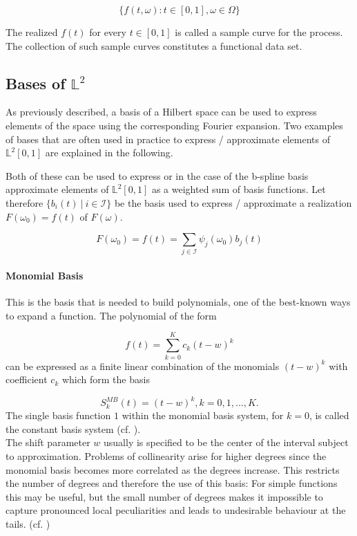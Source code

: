 \documentclass[11pt,twoside,a4paper]{article}
\begin{document}
	\begin{equation}
	\{f(t,\omega) : t \in [0, 1], \omega \in \Omega\}
	\end{equation}
	
	The realized $f(t)$ for every $t \in [0,1]$ is called a sample curve for the process. The collection of such sample curves constitutes a functional data set.
	
	\subsection{Bases of $\mathbb{L}^2$}
	As previously described, a basis of a Hilbert space can be used to express elements of the space using the corresponding Fourier expansion. Two examples of bases that are often used in practice to express / approximate elements of $\mathbb{L}^2[0,1]$  are explained in the following.
	
	Both of these can be used to express or in the case of the b-spline basis approximate elements of $\mathbb{L}^2[0,1]$ as a weighted sum of basis functions. Let therefore $\{b_i(t) \: \vert \: i \in \mathcal{I}\}$ be the basis used to express / approximate a realization $F(\omega_0) = f(t)$ of $F(\omega)$.
	
	\begin{equation}
		F(\omega_0) = f(t) = \sum_{j \in \mathcal{I}} \psi_j(\omega_0) b_j(t)
	\end{equation}
	
	\paragraph{Monomial Basis}
This is the basis that is needed to build polynomials, one of the best-known ways to expand a function.
The polynomial of the form 

	\begin{equation}
		f(t) = \sum_{k =0}^{K} c_k(t -w)^{k}
	\end{equation}
	can be expressed as a finite linear combination of the monomials $(t - w)^{k}$ with coefficient $c_k$ which form the basis 
	
	\begin{equation}
		S_{k}^{MB}(t) = (t-w)^k, k = 0, 1, ..., K.
	\end{equation}
	The single basis function $1$ within the monomial basis system, for $k=0$, is called the constant basis system (cf. \cite{horvath_inference_2012}).\\
	The shift parameter $w$ usually is specified to be the center of the interval subject to approximation.
	 Problems of collinearity arise for higher degrees since the monomial basis becomes more correlated as the degrees increase. This restricts the number of degrees and therefore the use of this basis: For simple functions this may be useful, but the small number of degrees makes it impossible to capture pronounced local peculiarities and leads to undesirable behaviour at the tails. (cf. \cite{ramsay_functional_2005})
\end{document}
